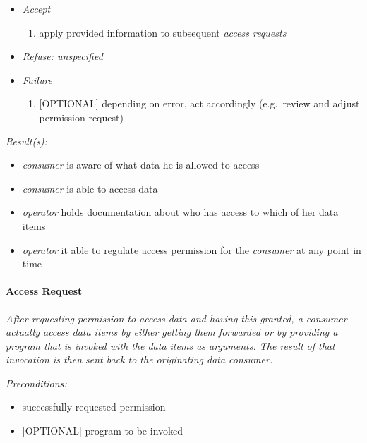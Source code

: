 \documentclass[12pt,english,a4paper,titlepage,cleardoublepage=empty,dottedtoc]{report}
\providecommand{\tightlist}{%
  \setlength{\itemsep}{0pt}\setlength{\parskip}{0pt}}
\begin{document}
\begin{enumerate}
  \begin{itemize}
  \item
    \emph{Accept}

    \begin{enumerate}
    \def\labelenumii{\arabic{enumii})}
    \tightlist
    \item
      apply provided information to subsequent \emph{access requests}
    \end{enumerate}
  \item
    \emph{Refuse: unspecified}
  \item
    \emph{Failure}

    \begin{enumerate}
    \def\labelenumii{\arabic{enumii})}
    \tightlist
    \item
      {[}OPTIONAL{]} depending on error, act accordingly (e.g.~review
      and adjust permission request)
    \end{enumerate}
  \end{itemize}
\end{enumerate}

\emph{Result(s):}

\begin{itemize}
\tightlist
\item
  \emph{consumer} is aware of what data he is allowed to access
\item
  \emph{consumer} is able to access data
\item
  \emph{operator} holds documentation about who has access to which of
  her data items
\item
  \emph{operator} it able to regulate access permission for the
  \emph{consumer} at any point in time
\end{itemize}

\paragraph{Access Request}\label{access-request}

\emph{After requesting permission to access data and having this
granted, a consumer actually access data items by either getting them
forwarded or by providing a program that is invoked with the data items
as arguments. The result of that invocation is then sent back to the
originating data consumer.}

\emph{Preconditions:}

\begin{itemize}
\tightlist
\item
  successfully requested permission
\item
  {[}OPTIONAL{]} program to be invoked
\end{itemize}
\end{document}
